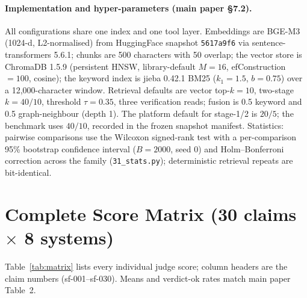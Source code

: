 \documentclass[sigconf, review, anonymous]{acmart}
\begin{document}
\paragraph*{Implementation and hyper-parameters (main paper \S7.2).}
All configurations share one index and one tool layer. Embeddings are BGE-M3
(1024-d, L2-normalised) from HuggingFace snapshot \texttt{5617a9f6} via
sentence-transformers 5.6.1; chunks are 500 characters with 50 overlap; the
vector store is ChromaDB 1.5.9 (persistent HNSW, library-default
$M{=}16$, efConstruction${=}100$, cosine); the keyword index is jieba 0.42.1
BM25 ($k_1{=}1.5$, $b{=}0.75$) over a 12{,}000-character window. Retrieval
defaults are vector top-$k{=}10$, two-stage $k{=}40/10$, threshold
$\tau{=}0.35$, three verification reads; fusion is 0.5 keyword and 0.5
graph-neighbour (depth 1). The platform default for stage-1/2 is $20/5$; the
benchmark uses $40/10$, recorded in the frozen snapshot manifest. Statistics:
pairwise comparisons use the Wilcoxon signed-rank test with a per-comparison
95\% bootstrap confidence interval ($B{=}2000$, seed 0) and
Holm--Bonferroni correction across the family
(\texttt{31\_stats.py}); deterministic retrieval repeats are bit-identical.

\section{Complete Score Matrix (30 claims $\times$ 8 systems)}\label{app:matrix}
Table~\ref{tab:matrix} lists every individual judge score; column headers
are the claim numbers (sf-001--sf-030). Means and verdict-ok rates match
main paper Table~2.
\end{document}
